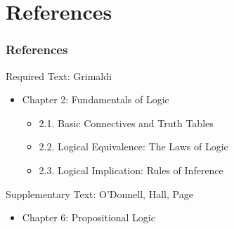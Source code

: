 \documentclass[dvipsnames]{beamer}
\begin{document}
\section*{References}

\begin{frame}
  \frametitle{References}

  \begin{block}{Required Text: Grimaldi}
    \begin{itemize}
      \item Chapter 2: Fundamentals of Logic
      \begin{itemize}
        \item 2.1. \alert{Basic Connectives and Truth Tables}
        \item 2.2. \alert{Logical Equivalence: The Laws of Logic}\\
        \item 2.3. \alert{Logical Implication: Rules of Inference}
      \end{itemize}
    \end{itemize}
  \end{block}

  \begin{block}{Supplementary Text: O'Donnell, Hall, Page}
    \begin{itemize}
      \item Chapter 6: Propositional Logic
    \end{itemize}
  \end{block}
\end{frame}
\end{document}
